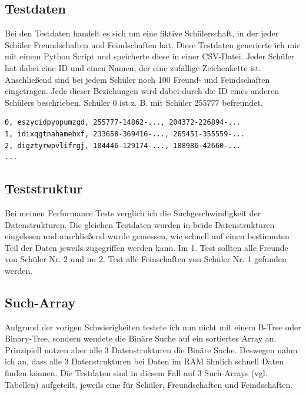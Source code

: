 \documentclass[11pt,a4paper]{article}
\begin{document}
\subsection{Testdaten}

Bei den Testdaten handelt es sich um eine fiktive Schülerschaft, in der jeder
Schüler Freundschaften und Feindschaften hat. Diese Testdaten generierte ich mir
mit einem Python Script und speicherte diese in einer CSV-Datei.
Jeder Schüler hat dabei eine ID und einen Namen, der eine zufällige Zeichenkette ist.
Anschließend sind bei jedem Schüler noch 100 Freund- und Feindschaften eingetragen.
Jede dieser Beziehungen wird dabei durch die ID eines anderen Schülers beschrieben.
Schüler $0$ ist z. B. mit Schüler $255777$ befreundet.

\begin{lstlisting}
0, eszycidpyopumzgd, 255777-14862-..., 204372-226894-...
1, idixqgtnahamebxf, 233658-369416-..., 265451-355559-...
2, digztyrwpvlifrgj, 104446-129174-..., 188986-42660-...
...
\end{lstlisting}

\subsection{Teststruktur}

Bei meinen Performance Tests verglich ich die Suchgeschwindigkeit der Datenstrukturen.
Die gleichen Testdaten wurden in beide Datenstrukturen eingelesen und anschließend
wurde gemessen, wie schnell auf einen bestimmten Teil der Daten jeweils zugegriffen
werden kann. Im 1. Test sollten alle Freunde von Schüler Nr. 2 und im 2. Test alle
Feinschaften von Schüler Nr. 1 gefunden werden.

\subsection{Such-Array}

Aufgrund der vorigen Schwierigkeiten testete ich nun nicht
mit einem B-Tree oder Binary-Tree, sondern wendete die Binäre Suche
auf ein sortiertes Array an. Prinzipiell nutzen aber alle 3 Datenstrukturen die
Binäre Suche. Deswegen nahm ich an, dass alle 3 Datenstrukturen bei Daten im RAM
ähnlich schnell Daten finden können.
Die Testdaten sind in diesem Fall auf 3 Such-Arrays (vgl. Tabellen)
aufgeteilt, jeweils eine für Schüler, Freundschaften und Feindschaften.
\end{document}
